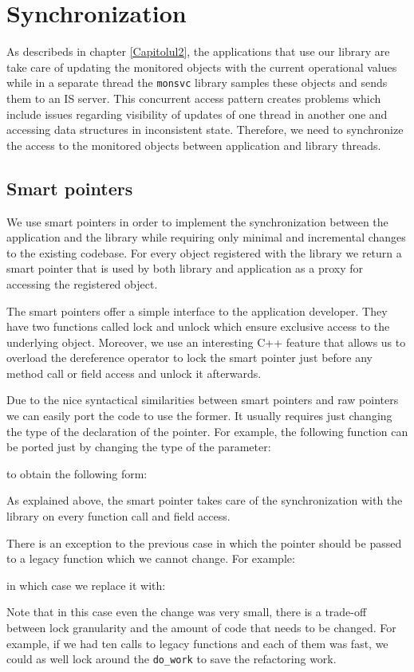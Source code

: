 \chapter{Synchronization} %
\label{Capitolul5}


As describeds in chapter \ref{Capitolul2}, the applications that use our library are take care of updating the monitored objects with the current operational values while in a separate thread the {\tt monsvc} library samples these objects and sends them to an IS server. This concurrent access pattern creates problems which include issues regarding visibility of updates of one thread in another one and accessing data structures in inconsistent state. Therefore, we need to synchronize the access to the monitored objects between application and library threads.

\section*{Smart pointers}

We use smart pointers in order to implement the synchronization between the application and the library while requiring only minimal and incremental changes to the existing codebase. For every object registered with the library we return a smart pointer that is used by both library and application as a proxy for accessing the registered object. 

The smart pointers offer a simple interface to the application developer. They have two functions called lock and unlock which ensure exclusive access to the underlying object. Moreover, we use an interesting C++ feature \citep{andrei2001modern} that allows us to overload the dereference operator to lock the smart pointer just before any method call or field access and unlock it afterwards.

Due to the nice syntactical similarities between smart pointers and raw pointers we can easily port the code to use the former. It usually requires just changing the type of the declaration of the pointer. For example, the following function can be ported just by changing the type of the parameter:

to obtain the following form:

As explained above, the smart pointer takes care of the synchronization with the library on every function call and field access.

There is an exception to the previous case in which the pointer should be passed to a legacy function which we cannot change. For example:

in which case we replace it with:

Note that in this case even the change was very small, there is a trade-off between lock granularity and the amount of code that needs to be changed. For example, if we had ten calls to legacy functions and each of them was fast, we could as well lock around the \verb+do_work+ to save the refactoring work.

